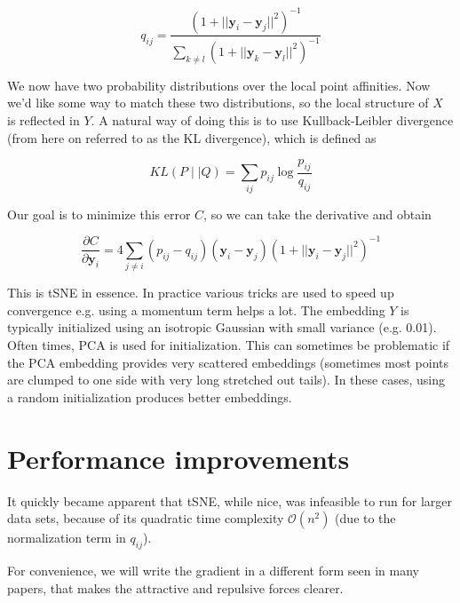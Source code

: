 \documentclass[11pt]{article}
\begin{document}
\begin{equation}
q_{ij} = \frac{\left ( 1 + || \mathbf{y}_i - \mathbf{y}_j ||^2 \right )^{-1}}{\sum_{k \neq l}\left ( 1 + || \mathbf{y}_k - \mathbf{y}_l ||^2 \right )^{-1}}
\end{equation}

We now have two probability distributions over the local point affinities. Now we'd like some way to match these two distributions, so the local structure of $X$ is reflected in $Y$. A natural way of doing this is to use Kullback-Leibler divergence (from here on referred to as the KL divergence), which is defined as

\begin{equation}
KL(P \mid \mid Q) = \sum_{ij} p_{ij} \log \frac{p_{ij}}{q_{ij}}
\end{equation}

Our goal is to minimize this error $C$, so we can take the derivative and obtain

\begin{equation}
\frac{\partial C}{\partial \mathbf{y}_i} = 4 \sum_{j \neq i} \left ( p_{ij} - q_{ij} \right ) \left ( \mathbf{y}_i - \mathbf{y}_j \right ) \left ( 1 + || \mathbf{y}_i - \mathbf{y}_j || ^2 \right )^{-1}
\end{equation}

This is tSNE in essence. In practice various tricks are used to speed up convergence e.g. using a momentum term helps a lot. The embedding $Y$ is typically initialized using an isotropic Gaussian with small variance (e.g. 0.01). Often times, PCA is used for initialization. This can sometimes be problematic if the PCA embedding provides very scattered embeddings (sometimes most points are clumped to one side with very long stretched out tails). In these cases, using a random initialization produces better embeddings.

\section{Performance improvements}
It quickly became apparent that tSNE, while nice, was infeasible to run for larger data sets, because of its quadratic time complexity $\mathcal{O}(n^2)$ (due to the normalization term in $q_{ij}$).

For convenience, we will write the gradient in a different form seen in many papers, that makes the attractive and repulsive forces clearer.
\end{document}
